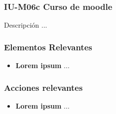 
\subsubsection{IU-M06c Curso de moodle}

 Descripción ...


\subsubsection{Elementos Relevantes}

    \begin{itemize}
    \item {\bf Lorem ipsum}
        ...
    \end{itemize}

\subsubsection{Acciones relevantes}

    \begin{itemize}
    \item {\bf Lorem ipsum}
        ...
    \end{itemize}

\clearpage
